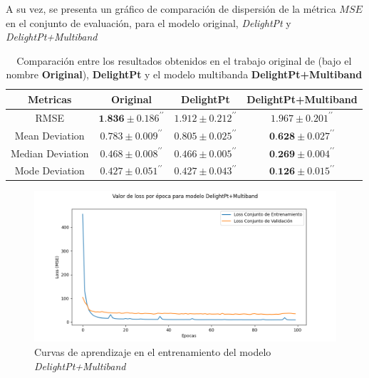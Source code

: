 \documentclass[../tesis.tex]{subfiles}
\begin{document}
A su vez, se presenta un gráfico de comparación de dispersión de la métrica $MSE$ en el conjunto de evaluación, para el modelo original, \textit{DelightPt} y \textit{DelightPt+Multiband} \par\null\par

\begin{table}[ht]
    \centering
    \begin{tabular}{|c|c|c|c|}
        \hline
        Metricas & Original & DelightPt & DelightPt+Multiband \\ \hline
        RMSE & $\textbf{1.836} \pm 0.186^{\prime \prime}$ & $1.912 \pm 0.212^{\prime \prime}$ & $1.967 \pm 0.201^{\prime \prime}$ \\ \hline
        Mean Deviation & $0.783 \pm 0.009^{\prime \prime}$ & $0.805 \pm 0.025^{\prime \prime}$ & $\textbf{0.628} \pm 0.027^{\prime \prime}$ \\ \hline
        Median Deviation & $0.468 \pm 0.008^{\prime \prime}$ & $0.466 \pm 0.005^{\prime \prime}$ & $\textbf{0.269} \pm 0.004^{\prime \prime}$ \\ \hline
        Mode Deviation & $0.427 \pm 0.051^{\prime \prime}$ & $0.427 \pm 0.043^{\prime \prime}$ & $\textbf{0.126} \pm 0.015^{\prime \prime}$ \\ \hline
    \end{tabular}
    \caption{Comparación entre los resultados obtenidos en el trabajo original de \cite{delight} (bajo el nombre \textbf{Original}), \textbf{DelightPt} y el modelo multibanda \textbf{DelightPt+Multiband}}
    \label{tab:multiband_comparison}
\end{table}

\begin{figure}[h]
    \centering
    \includegraphics[width=1\linewidth]{delightpt+multiband.png}
    \caption{Curvas de aprendizaje en el entrenamiento del modelo \textit{DelightPt+Multiband}}
    \label{fig:training-curves-delightpt+multiband}
\end{figure}
\end{document}
